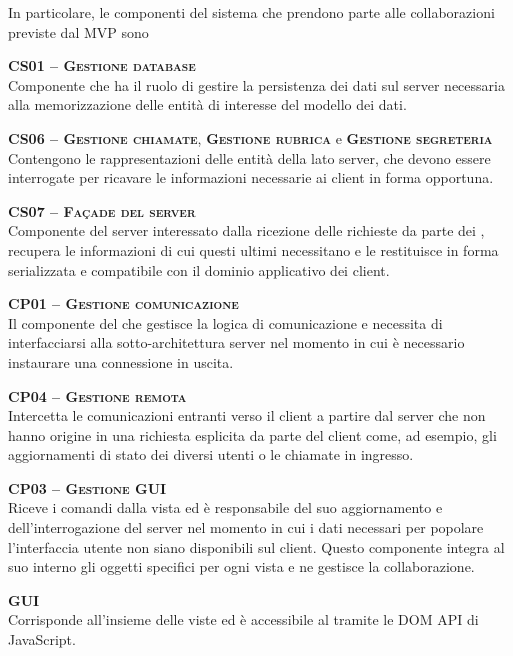 In particolare, le componenti del sistema che prendono parte alle collaborazioni previste dal  MVP sono
\begin{description}
  \item{\scshape\bfseries CS01 -- Gestione database}\\
Componente che ha il ruolo di gestire la persistenza dei dati sul server necessaria alla memorizzazione delle entità di interesse del modello dei dati.

  \item{\textsc{\bfseries CS06 -- Gestione chiamate}, \textsc{\bfseries Gestione rubrica} e \textsc{\bfseries Gestione segreteria}}\\
Contengono le rappresentazioni delle entità della  lato server, che devono essere interrogate per ricavare le informazioni necessarie ai client in forma opportuna.

  \item{\scshape\bfseries CS07 -- Façade del server}\\
Componente del server interessato dalla ricezione delle richieste da parte dei , recupera le informazioni di cui questi ultimi necessitano e le restituisce in forma serializzata e compatibile con il dominio applicativo dei client.

  \item{\scshape\bfseries CP01 -- Gestione comunicazione}\\
Il componente del  che gestisce la logica di comunicazione e necessita di interfacciarsi alla sotto-architettura server nel momento in cui è necessario instaurare una connessione in uscita.

  \item{\scshape\bfseries CP04 -- Gestione remota}\\
Intercetta le comunicazioni entranti verso il client a partire dal server che non hanno origine in una richiesta esplicita da parte del client come, ad esempio, gli aggiornamenti di stato dei diversi utenti o le chiamate in ingresso.
  
  \item{\scshape\bfseries CP03 -- Gestione GUI}\\
Riceve i comandi dalla vista ed è responsabile del suo aggiornamento e dell'interrogazione del server nel momento in cui i dati necessari per popolare l'interfaccia utente non siano disponibili sul client. Questo componente integra al suo interno gli oggetti  specifici per ogni vista e ne gestisce la collaborazione.

  \item{\scshape\bfseries GUI}\\
Corrisponde all'insieme delle viste ed è accessibile al  tramite le DOM API di JavaScript.
\end{description}

